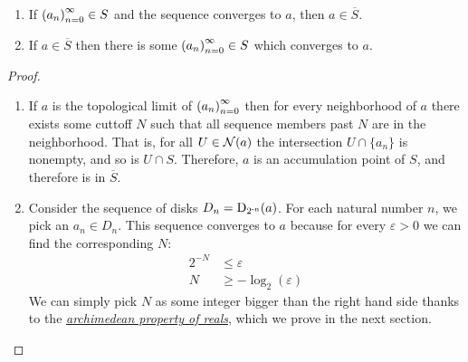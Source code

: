 \begin{theorem}
\begin{enumerate}
\item If $\seq{a} \in S$ and the sequence converges to $a$, then $a \in \overline{S}$.
\item If $a \in \overline{S}$ then there is some $\seq{a} \in S$ which converges to $a$.
\end{enumerate}
\end{theorem}
\begin{proof}
\begin{enumerate}
\item If $a$ is the topological limit of $\seq{a}$ then for every neighborhood of $a$ there exists some cuttoff $N$ such that all sequence members past $N$ are in the neighborhood. That is, for all $U \in \nbhd{a}$ the intersection $U \cap \{a_n\}$ is nonempty, and so is $U \cap S$. Therefore, $a$ is an accumulation point of $S$, and therefore is in $\overline{S}$.
\item Consider the sequence of disks $D_n = \disk{a}{2^{-n}}$. For each natural number $n$, we pick an $a_n \in D_n$. This sequence converges to $a$ because for every $\varepsilon > 0$ we can find the corresponding $N$:
\begin{align*}
2^{-N} &\leq \varepsilon\\
N &\geq -\log_2 (\varepsilon) 
\end{align*}
We can simply pick $N$ as some integer bigger than the right hand side thanks to the \hyperlink{Archimedean Property}{\emph{archimedean property of reals}}, which we prove in the next section.
\end{enumerate}
\end{proof}
